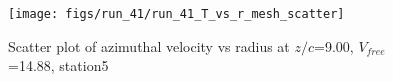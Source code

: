 \begin{figure}[H]
\centering
\texttt{[image: figs/run\_41/run\_41\_T\_vs\_r\_mesh\_scatter]}
\caption{Scatter plot of azimuthal velocity vs radius at $z/c$=9.00, $V_{free}$=14.88, station5}
\label{fig:run_41_T_vs_r_mesh_scatter}
\end{figure}


